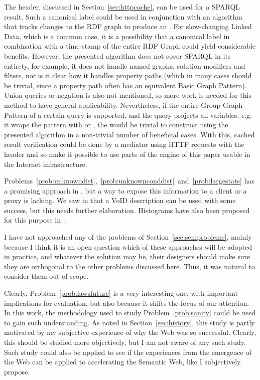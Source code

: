 The  header, discussed in Section~\ref{sec:httpcache}, can
be used for a SPARQL result. Such a canonical label could be used in
conjunction with an algorithm that tracks changes to the RDF graph to
produce an . For slow-changing Linked Data, which is a
common case, it is a possibility that a canonical label in combination
with a time-stamp of the entire RDF Graph could yield considerable
benefits. However, the presented algorithm does not cover SPARQL in
its entirety, for example, it does not handle named graphs, solution
modifiers and filters, nor is it clear how it handles property paths
(which in many cases should be trivial, since a property path often
has an equivalent Basic Graph Pattern). Union queries or negation is
also not mentioned, so more work is needed for this method to have
general applicability. Nevertheless, if the entire Group Graph Pattern
of a certain query is supported, and the query projects all variables,
e.g. it wraps the pattern with  or
, the  would be trivial to construct
using the presented algorithm in a non-trivial number of beneficial
cases. With this, cached result verification could be done by a
mediator using HTTP requests with the  header and
so make it possible to use parts of the engine of this paper usable in
the Internet infrastructure.


Problems~\ref{prob:unknowndist},~\ref{prob:unknownconddist}~and~\ref{prob:largestats}
has a promising approach in \cite{5767868}, but a way to expose this
information to a client or a proxy is lacking. We saw in
\cite{splendid} that a VoID description can be used with some success,
but this needs further elaboration. Histograms have also been proposed
for this purpose in \cite{Umbrich2011}.

I have not approached any of the problems of
Section~\ref{sec:semproblems}, mainly because I think it is an open
question which of these approaches will be adopted in practice, and
whatever the solution may be, their designers should make sure they
are orthogonal to the other problems discussed here. Thus, it was
natural to consider them out of scope. 

Clearly, Problem~\ref{prob:lawsfuture} is a very interesting one, with
important implications for evaluation, but also because it shifts the
focus of our attention. In this work, the methodology used to study
Problem~\ref{prob:sanity} could be used to gain such understanding. As
noted in Section~\ref{sec:history}, this study is partly motivated by
my subjective experience of why the Web was so successful. Clearly,
this should be studied more objectively, but I am not aware of any
such study. Such study could also be applied to see if the experiences
from the emergence of the Web can be applied to accelerating the
Semantic Web, like I subjectively propose.

